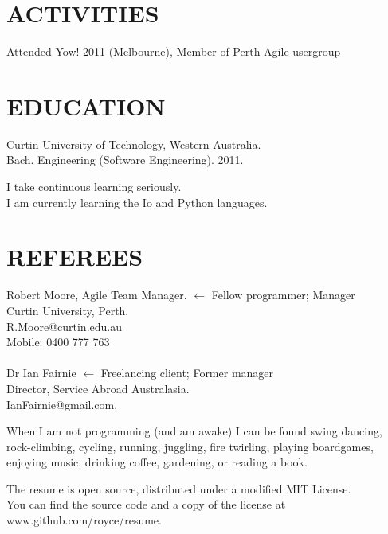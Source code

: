 \documentclass[margin]{res}
\begin{document}
\begin{resume}

  \section{ACTIVITIES}
  Attended Yow! 2011 (Melbourne),
  Member of Perth Agile usergroup

  \section{EDUCATION}
  Curtin University of Technology, Western Australia. \\
  Bach. Engineering (Software Engineering). 2011.
  
  I take continuous learning seriously.\\I am currently learning the Io and Python languages.

  \section{REFEREES}
  Robert Moore, Agile Team Manager.
  \hfill $\longleftarrow$ Fellow programmer; Manager\\
  Curtin University, Perth. \\
  R.Moore@curtin.edu.au \\
  Mobile: 0400 777 763 \\
  \\
  Dr Ian Fairnie
  \hfill $\longleftarrow$ Freelancing client; Former manager\\
  Director, Service Abroad Australasia. \\
  IanFairnie@gmail.com. \\

\end{resume} 

\vfill
\centering

\hspace{-1.75in}  When I am not programming (and am awake) I can be found swing dancing, \\
\hspace{-1.75in}  rock-climbing, cycling, running, juggling, fire twirling, playing boardgames, \\
\hspace{-1.75in}  enjoying music, drinking coffee, gardening, or reading a book.

\vfill
\hspace{-1.75in}  The resume is open source, distributed under a modified MIT License. \\
\hspace{-1.75in}  You can find the source code and a copy of the license at www.github.com/royce/resume.
\end{document}
